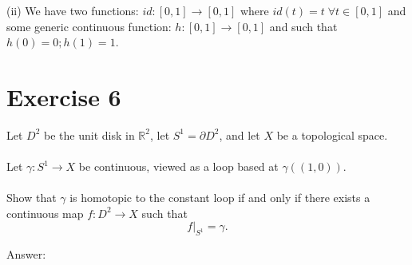 \documentclass[12pt]{article}
\begin{document}
\newpage
\noindent
(ii) We have two functions: $id:[0,1] \to [0,1]$ where $id(t)=t \; \forall t \in [0,1]$ and some generic continuous function:
$h:[0,1] \to [0,1]$ and such that $h(0)=0; h(1)=1$.

\newpage

\section*{Exercise 6}

Let $D^2$ be the unit disk in $\mathbb{R}^2$,
let $S^1=\partial D^2$, and let $X$ be a
topological space.\\
\\
Let $\gamma:S^1\to X$ be continuous, viewed
as a loop based at $\gamma((1,0))$.\\
\\
Show that $\gamma$ is homotopic to the constant
loop if and only if there exists a continuous
map $f:D^2\to X$ such that
\[
f|_{S^1}=\gamma.
\]

\vspace{1cm}
\noindent
Answer:\\
\\
\end{document}

